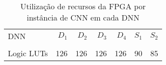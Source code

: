 \begin{table}[ht!]
\centering
\caption{Utilização de recursos da FPGA por instância de CNN em cada DNN}
\label{tab:5-vivado-cnn}
\begin{tabular}{lrrrrrr}
\toprule
DNN & $D_1$ & $D_2$ & $D_3$ & $D_4$ & $S_1$ & $S_2$ \\
 &  &  &  &  &  &  \\
\midrule
Logic LUTs &        126 &        126 &        126 &        126 &         90 &         85 \\
\bottomrule
\end{tabular}
\end{table}
